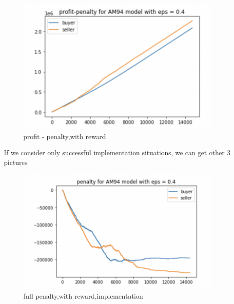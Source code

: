 \documentclass[11pt]{article}
\begin{document}
\begin{figure}[H]
	\begin{center}
	\includegraphics[width=0.9\textwidth]{9.PNG}
	\end{center}
	\caption{profit - penalty,with reward}
	\label{FIG.9}
\end{figure}	

If we consider only successful implementation situations, we can get other 3 pictures

\begin{figure}[H]
	\begin{center}
	\includegraphics[width=0.9\textwidth]{10.PNG}
	\end{center}
	\caption{full penalty,with reward,implementation}
	\label{FIG.10}
\end{figure}
\end{document}
